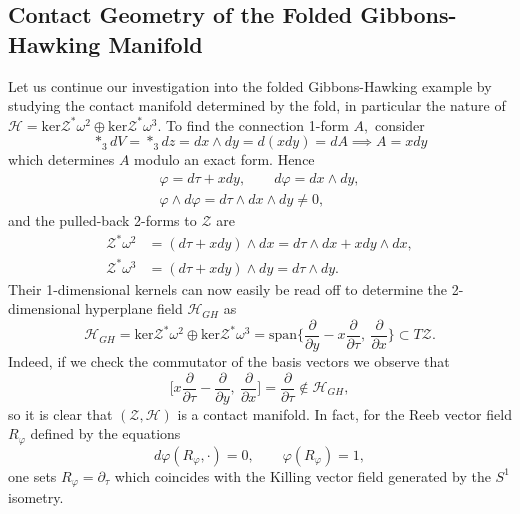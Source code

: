 \documentclass[a4paper,12pt, onecolumn, notitlepage]{article}
\theoremstyle{definition}
\theoremstyle{remark}
\newcommand{\w}{\omega}
\newcommand{\dd}[2]{\frac{\partial #1}{\partial #2}}
\newcommand{\vp}{\varphi}
\begin{document}
\subsection{Contact Geometry of the Folded Gibbons-Hawking Manifold}	
Let us continue our investigation into the folded Gibbons-Hawking example by studying the contact manifold determined by the fold, in particular the nature of $\mathcal{H}=\text{ker}\mathcal{Z}^{\ast}\w^{2}\oplus\text{ker}\mathcal{Z}^{\ast}\w^{3}.$ To find the connection 1-form $A,$ consider
\begin{equation}
	\ast_{3}dV=\ast_{3}dz = dx\wedge dy=d(xdy)=dA \implies A = xdy
\end{equation}
which determines $A$ modulo an exact form. Hence
\begin{gather*}
	\vp = d\tau + xdy,\qquad d\vp = dx\wedge dy,\\  \vp\wedge d\vp = d\tau\wedge dx\wedge dy \neq 0,
\end{gather*}
and the pulled-back 2-forms to $\mathcal{Z}$ are
\begin{align*}
	\mathcal{Z}^{\ast}\w^{2} &= (d\tau + xdy)\wedge dx = d\tau\wedge dx + x dy\wedge dx,\\ \mathcal{Z}^{\ast}\w^{3} &= (d\tau + xdy)\wedge dy = d\tau\wedge dy.
\end{align*}
Their 1-dimensional kernels can now easily be read off to determine the 2-dimensional hyperplane field $\mathcal{H}_{GH}$ as
\begin{equation*}
	\mathcal{H}_{GH}=\text{ker}\mathcal{Z}^{\ast}\w^{2}\oplus\text{ker}\mathcal{Z}^{\ast}\w^{3}=\text{span}\bigg\{\dd{}{y}-x\dd{}{\tau},\ \dd{}{x} \bigg\}\subset T\mathcal{Z}.
\end{equation*}
Indeed, if we check the commutator of the basis vectors we observe that
\begin{equation*}
	\bigg[ x\dd{}{\tau}-\dd{}{y},\ \dd{}{x}\bigg] = \dd{}{\tau}\not\in\mathcal{H}_{GH},
\end{equation*}
so it is clear that $(\mathcal{Z},\mathcal{H})$ is a contact manifold. In fact, for the Reeb vector field $R_{\vp}$ defined by the equations
\begin{equation}
	d\vp(R_{\vp},\cdot) = 0,\qquad
	\vp(R_{\vp})  = 1,
\end{equation}
one sets $R_{\vp}= \partial_{\tau}$ which coincides with the Killing vector field generated by the $S^{1}$ isometry.
\end{document}
